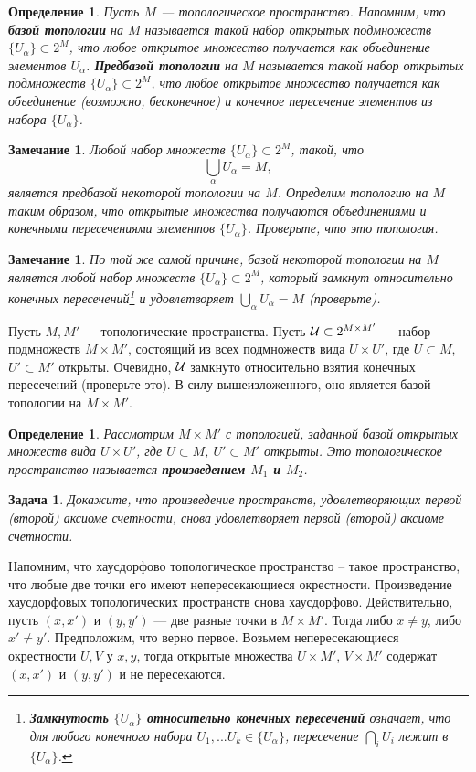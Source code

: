 \documentclass[12pt]{book}
\theoremstyle{upshape}
\newtheorem{zadacha}{Задача}[chapter]
\theoremstyle{generic}
\newtheorem{opredelenie}[teorema]{Определение}
\newtheorem{remark}[teorema]{Замечание}
\def\замечание{\begin{remark}}
\def\еза{\end{remark}}
\theoremstyle{upshapenonumber}
\newcommand{\следствие}{%
     \refstepcounter{teorema}
     {\noindent\bf Следствие \thechapter.\arabic{teorema}:\ }}
\newcommand{\пример}{%
     \refstepcounter{teorema}
     {\noindent\bf Пример \thechapter.\arabic{teorema}:\ }}
\newcommand{\лемма}{%
     \refstepcounter{teorema}
     {\noindent\bf Лемма \thechapter.\arabic{teorema}:\ }}
\newcommand{\теорема}{%
     \refstepcounter{teorema}
     {\noindent\bf Теорема \thechapter.\arabic{teorema}:\ }}
\newcommand{\утверждение}{%
     \refstepcounter{teorema}
     {\noindent\bf Утверждение \thechapter.\arabic{teorema}:\ }}
\def\бф{\bf}
\def\ем{\em}
\def\задача{\begin{zadacha}}
\def\ез{\end{zadacha}}
\def\еу{\end{ukazanie}}
\def\определение{\begin{opredelenie}}
\def\ео{\end{opredelenie}}
\def\енум{\begin{enumerate}}
\def\ее{\end{enumerate}}
\begin{document}
\определение
Пусть $M$ --- топологическое пространство.
Напом\-ним, что {\бф базой топологии} на $M$ называется
такой набор открытых подмножеств $\{U_\alpha\}\subset
2^M$, что любое открытое множество получается как 
объединение элементов $U_\alpha$.
{\бф Предбазой топологии} на $M$ называется
такой набор открытых подмножеств $\{U_\alpha\}\subset
2^M$, что любое открытое множество получается как 
объединение (возможно, бесконечное) и 
конечное пересечение элементов из набора 
$\{U_\alpha\}$.
\ео

\замечание
Любой набор множеств $\{U_\alpha\}\subset
2^M$, такой, что \[ \bigcup_\alpha U_\alpha=M,\] является
предбазой некоторой топологии на $M$. Определим  топологию на $M$
таким образом, что открытые множества получаются
объединениями и конечными пересечениями элементов
$\{U_\alpha\}$. Проверьте, что это топология.
\еза

\замечание
По той же самой причине, базой некоторой топологии на $M$
является любой набор множеств $\{U_\alpha\}\subset
2^M$, который замкнут относительно конечных
пересечений\footnote{{\bf Замкнутость $\{U_\alpha\}$ относительно
конечных пересечений} означает, что для любого конечного
набора $U_1, ... U_k \in \{U_\alpha\}$,
пересечение $\bigcap_i U_i$ лежит в $\{U_\alpha\}$.}
и удовлетворяет $\bigcup_\alpha U_\alpha=M$ (проверьте).
\еза

Пусть $M, M'$ --- топологические пространства.
Пусть ${\cal U}\subset 2^{M\times M'}$ --- набор подмножеств
$M\times M'$, состоящий из всех подмножеств
вида $U\times U'$, где $U\subset M$, $U'\subset M'$
открыты. Очевидно, ${\cal U}$ 
замкнуто относительно взятия конечных пересечений
(проверьте это). В силу вышеизложенного,
оно является базой топологии на $M\times M'$.

\определение
Рассмотрим $M\times M'$ с топологией, заданной базой
открытых множеств вида $U\times U'$, где $U\subset M$, $U'\subset M'$
открыты. Это топологическое пространство называется
{\бф произведением $M_1$ и $M_2$}.
\ео

\задача
Докажите, что произведение пространств,
удовлетворяющих первой (второй) аксиоме счетности,
снова удовлетворяет первой (второй) аксиоме счетности.
\ез


Напомним, что хаусдорфово топологическое пространство --
такое пространство, что любые две точки его имеют
непересекающиеся ок\-рес\-тности. 
Произведение хаусдорфовых топологических
пространств снова хаусдорфово. Действительно,
пусть $(x,x')$ и $(y, y')$ --- две разные точки в $M\times M'$.
Тогда либо $x\neq y$, либо  $x'\neq y'$. Предположим,
что верно первое. Возьмем непересекающиеся
окрестности $U, V$ у $x, y$, тогда открытые 
множества $U\times M'$, $V\times M'$ содержат
$(x,x')$ и $(y, y')$ и не пересекаются.
\end{document}
